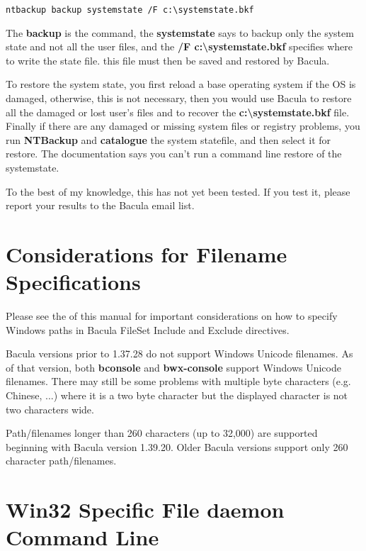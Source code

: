 \footnotesize
\begin{verbatim}
ntbackup backup systemstate /F c:\systemstate.bkf
\end{verbatim}
\normalsize

The {\bf backup} is the command, the {\bf systemstate} says to backup only the
system state and not all the user files, and the {\bf /F
c:\textbackslash{}systemstate.bkf} specifies where to write the state file.
this file must then be saved and restored by Bacula. 

To restore the system state, you first reload a base operating system if the
OS is damaged, otherwise, this is not necessary, then you would use Bacula to
restore all the damaged or lost user's files and to recover the {\bf
c:\textbackslash{}systemstate.bkf} file. Finally if there are any damaged or
missing system files or registry problems, you run {\bf NTBackup} and {\bf
catalogue} the system statefile, and then select it for restore. The
documentation says you can't run a command line restore of the systemstate. 

To the best of my knowledge, this has not yet been tested. If you test it,
please report your results to the Bacula email list. 

\section{Considerations for Filename Specifications}

Please see the 
 of this manual
for important considerations on how to specify Windows paths in Bacula FileSet
Include and Exclude directives. 

Bacula versions prior to 1.37.28 do not support Windows Unicode filenames.
As of that version, both {\bf bconsole} and {\bf bwx-console} support Windows
Unicode filenames. There may still be some problems with multiple byte
characters (e.g. Chinese, ...) where it is a two byte character but the
displayed character is not two characters wide.

Path/filenames longer than 260 characters (up to 32,000) are supported
beginning with Bacula version 1.39.20. Older Bacula versions support
only 260 character path/filenames.

\section{Win32 Specific File daemon Command Line}

